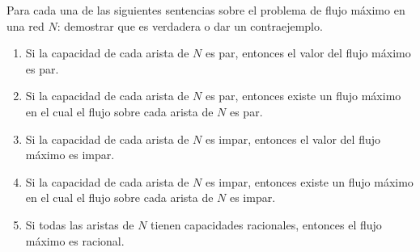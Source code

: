 

 \item Para cada una de las siguientes sentencias sobre el problema de flujo máximo en una red $N$: demostrar que es verdadera o dar un contraejemplo.
 \begin{enumerate}[label=$\alph*)$,ref=$\alph*)$]
  \item Si la capacidad de cada arista de $N$ es par, entonces el valor del flujo máximo es par.
  \item Si la capacidad de cada arista de $N$ es par, entonces existe un flujo máximo en el cual el flujo sobre cada arista de $N$ es par.
  \item Si la capacidad de cada arista de $N$ es impar, entonces el valor del flujo máximo es impar.
  \item Si la capacidad de cada arista de $N$ es impar, entonces existe un flujo máximo en el cual el flujo sobre cada arista de $N$ es impar.
  \item Si todas las aristas de $N$ tienen capacidades racionales, entonces el flujo máximo es racional.
 \end{enumerate}


